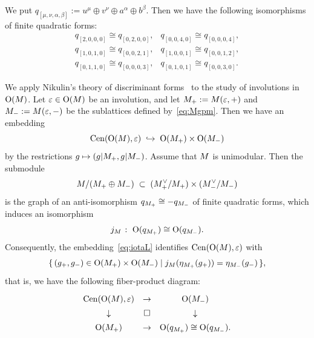 \documentclass{amsart} %
\begin{document}
\begin{remark}\label{rem:isomqs}
We put $q_{[\mu,\nu, \alpha, \beta]}:=u^{\mu}\oplus v^{\nu} \oplus a^{\alpha}\oplus b^{\beta}$. 
Then we have the following isomorphisms of finite quadratic forms:
%
%
\[
\renewcommand{\arraystretch}{1.1}
\begin{array}{ll}
q_{[ 2, 0, 0, 0]}\cong q_{[ 0, 2, 0, 0]}, &
q_{[ 0, 0, 4, 0]}\cong q_{[ 0, 0, 0, 4]}, \\
q_{[ 1, 0, 1, 0]}\cong q_{[ 0, 0, 2, 1 ]}, &
q_{[ 1, 0, 0, 1]}\cong q_{[ 0, 0, 1, 2 ]},\\
q_{[ 0, 1, 1, 0 ]}\cong q_{[ 0, 0, 0, 3 ]}, &
q_{[ 0, 1, 0, 1 ]}\cong q_{[ 0, 0, 3, 0]}.
\end{array}
\]
\end{remark}
%
We apply 
Nikulin's theory of discriminant forms~\cite{MR525944}
to the study of involutions in $\mathord{\mathrm{O}}(M)$.
Let $\varepsilon \in \mathord{\mathrm{O}}(M)$ be an involution, 
and let
$M_+:=M(\varepsilon,+)$ and
$M_-:=M(\varepsilon,-)$
be the sublattices defined by~\eqref{eq:Mgpm}.
Then we have an embedding
%
\begin{equation}\label{eq:iotaL}
\mathrm{Cen}(\mathord{\mathrm{O}}(M), \varepsilon)\;\hookrightarrow\; \mathord{\mathrm{O}}(M_+)\times \mathord{\mathrm{O}}(M_-)
\end{equation}
%
by the restrictions $g\mapsto (g|M_+, g|M_-)$.
Assume that $M$ is unimodular.
Then the submodule
\[
M/(M_+\oplus M_-) \;\subset\; (M_+^{\vee}/M_+)\times (M_-^{\vee}/M_-)
\]
is the graph of an anti-isomorphism
$q_{M_+} \cong -q_{M_-}$
of finite quadratic forms,
which 
induces an isomorphism
\[
j_M\;\colon\; \mathord{\mathrm{O}}(q_{M_+}) \cong \mathord{\mathrm{O}}(q_{M_-}).
\]
Consequently, the embedding~\eqref{eq:iotaL} identifies
$\mathrm{Cen}(\mathord{\mathrm{O}}(M),\varepsilon)$ with
%
\begin{equation*}\label{eq:CenL}
\{\,{(g_{+}, g_{-})\in \mathord{\mathrm{O}}(M_+)\times \mathord{\mathrm{O}}(M_-)}\mid {j_M(\eta_{M_+}(g_{+}))=\eta_{M_-}(g_{-})} \,\},
\end{equation*}
%
that is, we have the following fiber-product diagram:
%
\begin{equation}\label{eq:groupfibprodCenvep}
\renewcommand{\arraystretch}{1.4}
\begin{array}{ccc}
\Cen(\OG(\dLat), \vep) &\to & \OG(\dLatminus) \\
\downarrow & \square& \downarrow \\
\OG(\dLatplus) & \to & \OG(q_{\dLatplus}) \cong \OG(q_{\dLatminus}).
\end{array}
\end{equation}
%
%
\end{document}
